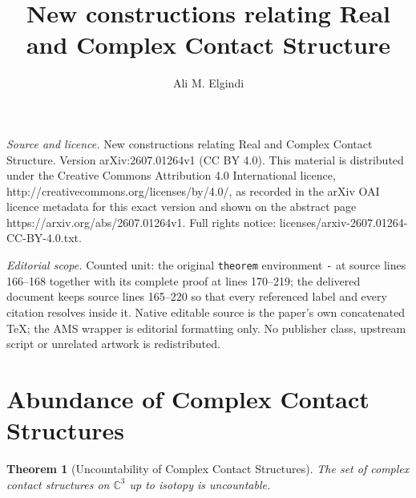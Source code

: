 \documentclass[10pt,a4paper]{amsart}
\newtheorem{theorem}{Theorem}
\begin{document}
\title[New constructions relating Real and Complex Contact Structur]{New constructions relating Real and Complex Contact Structure}
\author{Ali M. Elgindi}
\date{}
\maketitle
\noindent\emph{Source and licence.} New constructions relating Real and Complex Contact Structure. Version arXiv:2607.01264v1 (CC BY 4.0). This material is distributed under the Creative Commons Attribution 4.0 International licence, http://creativecommons.org/licenses/by/4.0/, as recorded in the arXiv OAI licence metadata for this exact version and shown on the abstract page https://arxiv.org/abs/2607.01264v1. Full rights notice: licenses/arxiv-2607.01264-CC-BY-4.0.txt.\par\smallskip
\noindent\textit{Editorial scope.} Counted unit: the original \texttt{theorem} environment \texttt{-} at source lines 166--168 together with its complete proof at lines 170--219; the delivered document keeps source lines 165--220 so that every referenced label and every citation resolves inside it. Native editable source is the paper's own concatenated TeX; the AMS wrapper is editorial formatting only. No publisher class, upstream script or unrelated artwork is redistributed.
\section{Abundance of Complex Contact Structures}

\begin{theorem}[Uncountability of Complex Contact Structures]
The set of complex contact structures on $\mathbb{C}^3$ up to isotopy is uncountable.
\end{theorem}
\end{document}
